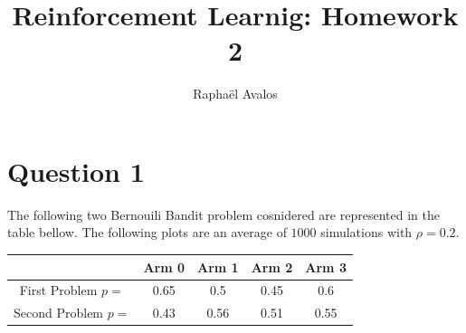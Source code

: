 \documentclass[10pt,a4paper]{article}
\author{Raphaël Avalos}
\title{Reinforcement Learnig: Homework 2}
\begin{document}
\maketitle

\section{Question 1}
The following two Bernouili Bandit problem cosnidered are represented in the table bellow. The following plots are an average of $1000$ simulations with $\rho = 0.2$.\\


\begin{tabular}{|c|c|c|c|c|}
\hline 
 & Arm 0 & Arm 1 & Arm 2 & Arm 3 \\ 
\hline 
First Problem $p=$ & 0.65 & 0.5 & 0.45 & 0.6 \\ 
\hline 
Second Problem $p=$ & 0.43 & 0.56 & 0.51 & 0.55 \\ 
\hline 
\end{tabular} 
\\
\end{document}
